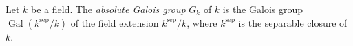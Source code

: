 \documentclass{article}
\begin{document}
Let $k$ be a field. The {\em absolute Galois group} $G_k$ of $k$ is the Galois group $\operatorname{Gal}(k^{\operatorname{sep}}/k)$ of the field extension $k^{\operatorname{sep}}/k$, where $k^{\operatorname{sep}}$ is the separable closure of $k$.
\end{document}
